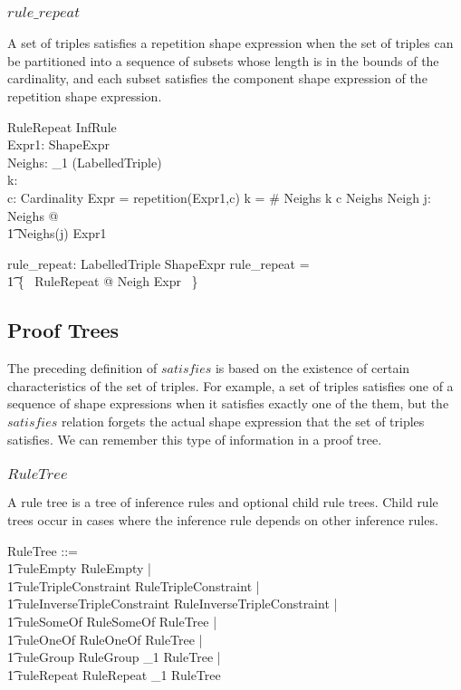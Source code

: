 \documentclass{article}
\begin{document}
\subsubsection{$rule\_repeat$}
A set of triples satisfies a repetition shape expression when the set of triples can be partitioned into a sequence of subsets whose length is
in the bounds of the cardinality, and each subset satisfies the component shape expression of the repetition shape expression.
\begin{schema}{RuleRepeat}
	InfRule \\
	Expr1: ShapeExpr \\
	Neighs: \seq_1 (\finset LabelledTriple) \\
	k: \nat \\
	c: Cardinality
\where
	Expr = repetition(Expr1,c)
\also
	k = \# Neighs
\also
	k  c
\also
	Neighs \partition Neigh
\also
	\forall j: \dom Neighs @ \\
\t1		Neighs(j)  Expr1
\end{schema}

\begin{axdef}
	rule\_repeat: \finset LabelledTriple \rel ShapeExpr
\where
	rule\_repeat = \\
\t1		\{~ RuleRepeat @ Neigh \mapsto Expr ~\}
\end{axdef}

\subsection{Proof Trees}
The preceding definition of $satisfies$ is based on the existence of certain characteristics of the set of triples.
For example, a set of triples satisfies one of a sequence of shape expressions when it satisfies exactly one of the them, 
but the $satisfies$ relation forgets the actual shape expression that the set of triples satisfies.
We can remember this type of information in a proof tree.

\subsubsection{$RuleTree$}
A rule tree is a tree of inference rules and optional child rule trees.
Child rule trees occur in cases where the inference rule depends on other inference rules.
\begin{zed}
	RuleTree ::= \\
\t1		ruleEmpty \ldata RuleEmpty \rdata | \\
\t1		ruleTripleConstraint \ldata RuleTripleConstraint \rdata | \\
\t1		ruleInverseTripleConstraint \ldata RuleInverseTripleConstraint \rdata | \\
\t1		ruleSomeOf \ldata RuleSomeOf \cross RuleTree \rdata | \\
\t1		ruleOneOf \ldata RuleOneOf \cross RuleTree \rdata | \\
\t1		ruleGroup \ldata RuleGroup \cross \seq_1 RuleTree \rdata | \\
\t1		ruleRepeat \ldata RuleRepeat \cross \seq_1 RuleTree \rdata
\end{zed}
\end{document}
